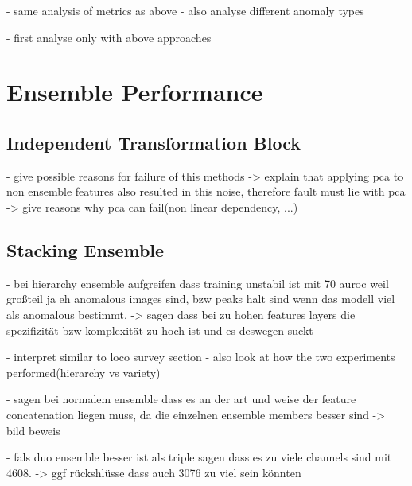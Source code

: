 - same analysis of metrics as above\newline
- also analyse different anomaly types\newline

- first analyse only with above approaches\newline



\section{Ensemble Performance}
\label{sec:ensemblediscussion}

\subsection{Independent Transformation Block}
\label{subsec:ITBfaildiscussion}

- give possible reasons for failure of this methods\newline
-> explain that applying pca to non ensemble features also resulted in this noise, therefore fault must lie with pca\newline
-> give reasons why pca can fail(non linear dependency, ...)\newline


\subsection{Stacking Ensemble}
\label{subsec:stackingdiscussion}


- bei hierarchy ensemble aufgreifen dass training unstabil ist mit 70 auroc weil großteil ja eh anomalous images sind, bzw peaks halt sind wenn das modell viel als anomalous bestimmt.
-> sagen dass bei zu hohen features layers die spezifizität bzw komplexität zu hoch ist und es deswegen suckt

- interpret similar to loco survey section\newline
- also look at how the two experiments performed(hierarchy vs variety)\newline


- sagen bei normalem ensemble dass es an der art und weise der feature concatenation liegen muss, da die einzelnen ensemble members besser sind
-> bild beweis

- fals duo ensemble besser ist als triple sagen dass es zu viele channels sind mit 4608. -> ggf rückshlüsse dass auch 3076 zu viel sein könnten

